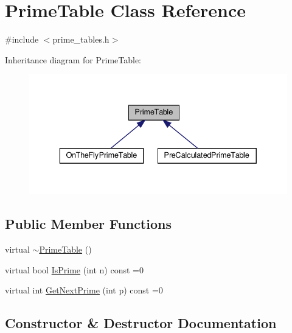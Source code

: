 \hypertarget{class_prime_table}{}\section{Prime\+Table Class Reference}
\label{class_prime_table}


{\ttfamily \#include $<$prime\+\_\+tables.\+h$>$}



Inheritance diagram for Prime\+Table\+:
\nopagebreak
\begin{figure}[H]
\begin{center}
\leavevmode
\includegraphics[width=336pt]{class_prime_table__inherit__graph}
\end{center}
\end{figure}
\subsection*{Public Member Functions}
\begin{DoxyCompactItemize}
\item 
virtual \hyperlink{class_prime_table_af2cdea4896fd86a42b4dfd5e5027d640}{$\sim$\+Prime\+Table} ()
\item 
virtual bool \hyperlink{class_prime_table_a2ab9243364ded0c51541f641b2df362a}{Is\+Prime} (int n) const =0
\item 
virtual int \hyperlink{class_prime_table_ae537c939f56617d8937d57bbbae3ab30}{Get\+Next\+Prime} (int p) const =0
\end{DoxyCompactItemize}


\subsection{Constructor \& Destructor Documentation}
\mbox{\label{class_prime_table_af2cdea4896fd86a42b4dfd5e5027d640}} 
